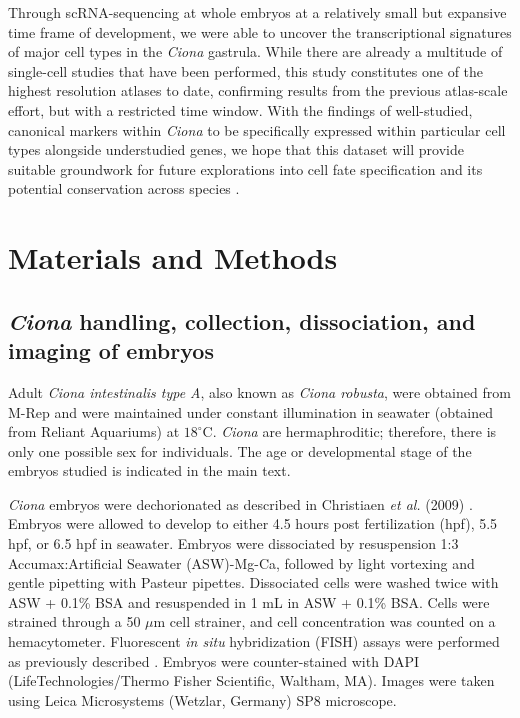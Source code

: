 Through scRNA-sequencing at whole embryos at a relatively small but expansive time frame of development, we were able to uncover the transcriptional signatures of major cell types in the \textit{Ciona} gastrula. While there are already a multitude of single-cell studies that have been performed, this study constitutes one of the highest resolution atlases to date, confirming results from the previous atlas-scale effort, but with a restricted time window. With the findings of well-studied, canonical markers within \textit{Ciona} to be specifically expressed within particular cell types alongside understudied genes, we hope that this dataset will provide suitable groundwork for future explorations into cell fate specification and its potential conservation across species \cite{winkley2021,sladitschek2020,zhang2020,ilsley2020,wang2019,horie2018,wang2021,cao2019}.

\section{Materials and Methods}

\subsection{\textit{Ciona} handling, collection, dissociation, and imaging of embryos}
Adult \textit{Ciona intestinalis type A}, also known as \textit{Ciona robusta}, were obtained from M-Rep and were maintained under constant illumination in seawater (obtained from Reliant Aquariums) at $18^\circ$C. \textit{Ciona} are hermaphroditic; therefore, there is only one possible sex for individuals. The age or developmental stage of the embryos studied is indicated in the main text.

\textit{Ciona} embryos were dechorionated as described in Christiaen \textit{et al.} (2009) \cite{christiaen2009}. Embryos were allowed to develop to either 4.5 hours post fertilization (hpf), 5.5 hpf, or 6.5 hpf in seawater. Embryos were dissociated by resuspension 1:3 Accumax:Artificial Seawater (ASW)-Mg-Ca, followed by light vortexing and gentle pipetting with Pasteur pipettes. Dissociated cells were washed twice with ASW + 0.1\% BSA and resuspended in 1 mL in ASW + 0.1\% BSA. Cells were strained through a 50 $\mu$m cell strainer, and cell concentration was counted on a hemacytometer. Fluorescent \textit{in situ} hybridization (FISH) assays were performed as previously described \cite{beh2007,ikuta2007,christiaen2009a,stolfi2014}. Embryos were counter-stained with DAPI (LifeTechnologies/Thermo Fisher Scientific, Waltham, MA). Images were taken using Leica Microsystems (Wetzlar, Germany) SP8 microscope.

